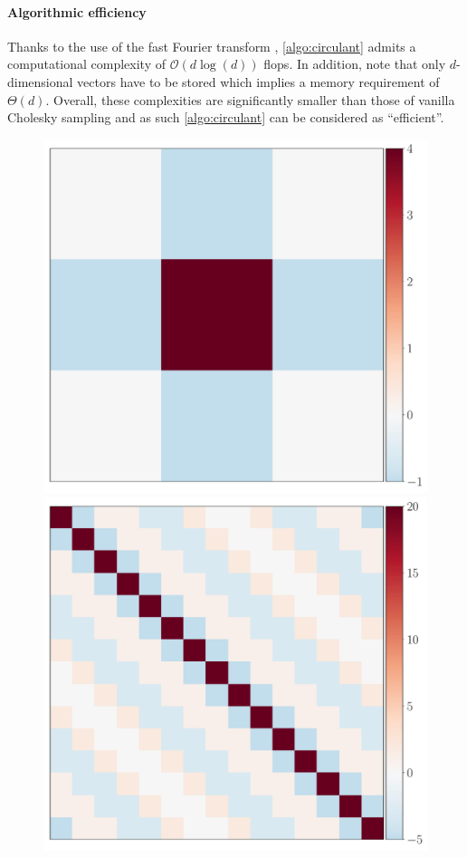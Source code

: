 \documentclass[nohypdvips,onefignum,onetabnum]{siamart171218}
\begin{document}
\paragraph{Algorithmic efficiency}
Thanks to the use of the fast Fourier transform \cite{Wood1994,Dietrich1997}, \cref{algo:circulant} admits a computational complexity of $\mathcal{O}(d\log(d))$ flops.
In addition, note that only $d$-dimensional vectors have to be stored which implies a memory requirement of $\Theta(d)$.
Overall, these complexities are significantly smaller than those of vanilla Cholesky sampling and as such \cref{algo:circulant} can be considered as ``efficient''.
%
\begin{figure}
  \centering
  \mbox{{\includegraphics[scale=0.17]{images/circulant_filter.pdf}}}
  \mbox{{\includegraphics[scale=0.17]{images/circulant_DTD.pdf}}}

\end{figure}
\end{document}
